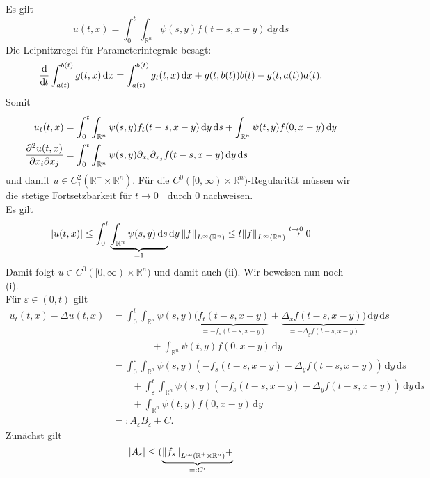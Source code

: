 \begin{beweis}
	Es gilt
	\[
		u(t,x)= \int_{0}^{t} \int_{\mathbb{R}^n}^{} \psi(s,y)f(t-s,x-y) \,\mathrm{d}y \,\mathrm{d}s
	\]
	Die Leipnitzregel für Parameterintegrale besagt:
	\[
		\frac{\mathrm{d}\mkern-1.0mu }{\mathrm{d}\mkern-1.0mu t}  \int_{a(t)}^{b(t)} g(t,x) \,\mathrm{d}x = \int_{a(t)}^{b(t)} g_t(t,x) \,\mathrm{d}x + g(t,b(t))b(t) - g(t,a(t))a(t).
	\]
	Somit
	\begin{align*}
		u_t(t,x) &= \int_{0}^{t} \int_{\mathbb{R}^n}^{} \psi(s,y)f_t(t-s,x-y) \,\mathrm{d}y \,\mathrm{d}s +
		\int_{\mathbb{R}^n}^{}\psi(t,y)f(0,x-y) \,\mathrm{d}y \\
		\frac{{\partial ^2u(t,x)}}{{\partial x_i \partial x_j}}  &= \int_{0}^{t} \int_{\mathbb{R}^n}^{} \psi(s,y) \partial_{x_i} \partial_{x_j} f(t-s,x-y) \,\mathrm{d}y \,\mathrm{d}s
	\end{align*}
	und damit $u \in C^2_1(\mathbb{R}^{+} \times \mathbb{R}^n)$. 
	Für die $C^0([0,\infty)\times \mathbb{R}^n)$-Regularität müssen wir die stetige Fortsetzbarkeit für $t \to 0^+$ durch $0$ nachweisen. \\
	Es gilt
	\[
		\abs{u(t,x)} \leq  \int_{0}^{t} \underset{=1}{\underbrace{\int_{\mathbb{R}^n}^{} \psi(s,y) \,\mathrm{d}s}} \,\mathrm{d}y \, \norm{f}_{L^{\infty}(\mathbb{R}^n)} 
		\leq t \norm{f}_{L^{\infty}(\mathbb{R}^n)} \stackrel{t \to 0}{\to} 0
	\]
	Damit folgt $u \in C^0([0,\infty) \times \mathbb{R}^n)$ und damit auch (ii). Wir beweisen nun noch (i). \\
	Für $\varepsilon \in (0,t)$ gilt
	\begin{align*}
		u_t(t,x)- \Delta u(t,x) &= \int_{0}^{t} \int_{\mathbb{R}^n}^{} \psi(s,y)(\underset{=-f_s(t-s,x-y)}{\underbrace{f_t(t-s,x-y)}} 
		+ \underset{=-\Delta_y f(t-s,x-y)}{\underbrace{ \Delta_x f(t-s,x-y))}} \,\mathrm{d}y \,\mathrm{d}s \\
		& \qquad \qquad + \int_{\mathbb{R}^n}^{} \psi(t,y) f(0,x-y) \,\mathrm{d}y \\
		&= \int_{0}^{\varepsilon} \int_{\mathbb{R}^n}^{} \psi(s,y) (-f_s(t-s,x-y) - \Delta_y f(t-s,x-y)) \,\mathrm{d}y \,\mathrm{d}s \\
		& \qquad + \int_{\varepsilon}^{t} \int_{\mathbb{R}^n}^{} \psi(s,y) (-f_s(t-s,x-y) - \Delta_y f(t-s,x-y)) \,\mathrm{d}y \,\mathrm{d}s \\
		& \qquad + \int_{\mathbb{R}^n}^{} \psi(t,y)f(0,x-y) \,\mathrm{d}y \\
		&=: A_{\varepsilon} B _{\varepsilon} + C.
	\end{align*}
	Zunächst gilt 
	\[
		\abs{A _{\varepsilon}} \leq ( \underset{=:C'}{\underbrace{\norm{f_s}_{L^{\infty}(\mathbb{R}^{+} \times \mathbb{R}^n)} +
}}\]
\end{beweis}
